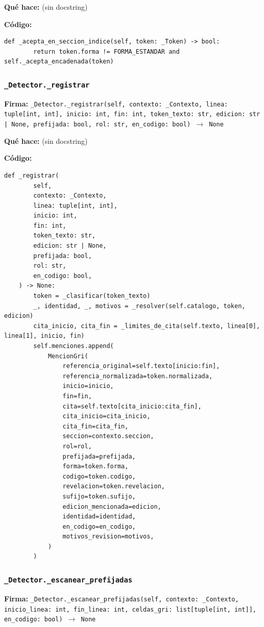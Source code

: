 \documentclass[11pt,a4paper]{article}
\begin{document}
\textbf{Qué hace:} (sin docstring)

\textbf{Código:}
\begin{lstlisting}
def _acepta_en_seccion_indice(self, token: _Token) -> bool:
        return token.forma != FORMA_ESTANDAR and self._acepta_encadenada(token)
\end{lstlisting}

\subsubsection*{\texttt{\_Detector.\_registrar}}
\textbf{Firma:} \texttt{\_Detector.\_registrar(self, contexto: \_Contexto, linea: tuple[int, int], inicio: int, fin: int, token\_texto: str, edicion: str | None, prefijada: bool, rol: str, en\_codigo: bool) $\rightarrow$ None}

\textbf{Qué hace:} (sin docstring)

\textbf{Código:}
\begin{lstlisting}
def _registrar(
        self,
        contexto: _Contexto,
        linea: tuple[int, int],
        inicio: int,
        fin: int,
        token_texto: str,
        edicion: str | None,
        prefijada: bool,
        rol: str,
        en_codigo: bool,
    ) -> None:
        token = _clasificar(token_texto)
        _, identidad, _, motivos = _resolver(self.catalogo, token, edicion)
        cita_inicio, cita_fin = _limites_de_cita(self.texto, linea[0], linea[1], inicio, fin)
        self.menciones.append(
            MencionGri(
                referencia_original=self.texto[inicio:fin],
                referencia_normalizada=token.normalizada,
                inicio=inicio,
                fin=fin,
                cita=self.texto[cita_inicio:cita_fin],
                cita_inicio=cita_inicio,
                cita_fin=cita_fin,
                seccion=contexto.seccion,
                rol=rol,
                prefijada=prefijada,
                forma=token.forma,
                codigo=token.codigo,
                revelacion=token.revelacion,
                sufijo=token.sufijo,
                edicion_mencionada=edicion,
                identidad=identidad,
                en_codigo=en_codigo,
                motivos_revision=motivos,
            )
        )
\end{lstlisting}

\subsubsection*{\texttt{\_Detector.\_escanear\_prefijadas}}
\textbf{Firma:} \texttt{\_Detector.\_escanear\_prefijadas(self, contexto: \_Contexto, inicio\_linea: int, fin\_linea: int, celdas\_gri: list[tuple[int, int]], en\_codigo: bool) $\rightarrow$ None}
\end{document}
